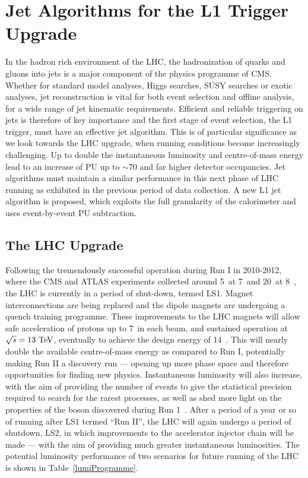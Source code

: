 \chapter{Jet Algorithms for the L1 Trigger Upgrade}
\label{chap:l1jets}

In the hadron rich environment of the \ac{LHC}, the hadronization of quarks and gluons into jets is a major component of the physics programme of \ac{CMS}. 
Whether for standard model analyses, Higgs searches, \ac{SUSY} searches or exotic analyses,
jet reconstruction is vital for both event selection and offline analysis, for a wide range of jet kinematic requirements.
Efficient and reliable triggering on jets is therefore of key importance
and the first stage of event selection, the \ac{L1} trigger, must have an effective jet algorithm.
This is of particular significance as we look towards the \ac{LHC} upgrade, when running conditions become increasingly challenging. 
Up to double the instantaneous luminosity and centre-of-mass energy lead to an increase of \ac{PU} up to $\sim 70$ and far higher detector occupancies.
Jet algorithms must maintain a similar performance in this next phase of \ac{LHC} running as exhibited in the previous period of data collection.
A new \ac{L1} jet algorithm is proposed, which exploits the full granularity of the calorimeter and uses event-by-event \ac{PU} subtraction. 

\section{The LHC Upgrade\label{sec:LHCupgrade}}

Following the tremendously successful operation during Run I in 2010-2012, where the \ac{CMS} and \ac{ATLAS}
experiments collected around 5~\fbinv at 7~\TeV and 20~\fbinv at 8~\TeV,
the \ac{LHC} is currently in a period of shut-down, termed \ac{LS1}. 
Magnet interconnections are being replaced and the dipole magnets are undergoing a quench training programme. 
These improvements to the \ac{LHC} magnets will allow safe acceleration of protons up to 7~\TeV in each beam, and sustained operation at $\sqrt{s}=13~\mathrm{TeV}$, eventually to achieve the design energy of 14~\TeV.
This will nearly double the available centre-of-mass energy as compared to Run I, potentially making Run II a discovery run --- opening up more phase space and therefore opportunities for finding new physics.
Instantaneous luminosity will also increase, with the aim of providing the number of events to give the statistical precision required to search for the rarest processes, as well as shed more light on the properties of the boson discovered during Run 1~\cite{Aad:2012tfa,Chatrchyan:2012ufa,HiggsEvidence}. 
After a period of a year or so of running after \ac{LS1} termed ``Run II'', the \ac{LHC} will again undergo a period of shutdown, 
\ac{LS2}, in which improvements to the accelerator injector chain will be made --- with the aim of providing much greater instantaneous luminosities. 
The potential luminosity performance of two scenarios for future running of the \ac{LHC} is shown in Table~\ref{lumiProgramme}. 

